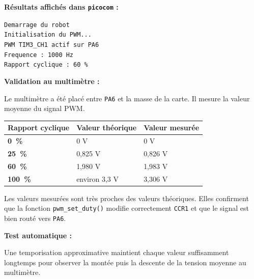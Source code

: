 \documentclass[11pt,a4paper]{article}
\begin{document}
\begin{sessionbox}
		\vspace{0.3cm}
		
		\textbf{Résultats affichés dans \texttt{picocom} :}
		
		\begin{center}
			\texttt{Demarrage du robot}\\
			\texttt{Initialisation du PWM...}\\
			\texttt{PWM TIM3\_CH1 actif sur PA6}\\
			\texttt{Frequence : 1000 Hz}\\
			\texttt{Rapport cyclique : 60 \%}
		\end{center}
		
		\vspace{0.3cm}
		
		\textbf{Validation au multimètre :}
		
		Le multimètre a été placé entre \texttt{PA6} et la masse de la carte. Il mesure la valeur moyenne du signal PWM.
		
		\begin{center}
			\begin{tabular}{>{\bfseries}p{3.8cm}p{4cm}p{4cm}}
				\toprule
				Rapport cyclique & Valeur théorique & Valeur mesurée \\
				\midrule
				0~\% & 0 V & 0 V \\
				25~\% & 0,825 V & 0,826 V \\
				60~\% & 1,980 V & 1,983 V \\
				100~\% & environ 3,3 V & 3,306 V \\
				\bottomrule
			\end{tabular}
		\end{center}
		
		Les valeurs mesurées sont très proches des valeurs théoriques. Elles confirment que la fonction \texttt{pwm\_set\_duty()} modifie correctement \texttt{CCR1} et que le signal est bien routé vers \texttt{PA6}.
		
		\vspace{0.3cm}
		
		\textbf{Test automatique :}
		
		\begin{center}
		\end{center}
		
		Une temporisation approximative maintient chaque valeur suffisamment longtemps pour observer la montée puis la descente de la tension moyenne au multimètre.
		

\end{sessionbox}
\end{document}
